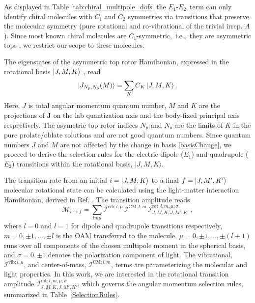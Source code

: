 \documentclass[reprint,aps,prl,twocolumn,superscriptaddress,groupedaddress]{revtex4-2}
\newcommand{\eoet}{$E_1$-$E_2$}
\begin{document}
 




As displayed in Table \ref{tab:chiral_multipole_dofs} the \eoet~term can only identify chiral molecules with $C_1$ and $C_2$ symmetries via transitions that preserve the molecular symmetry (pure rotational and ro-vibrational of the trivial irrep. $A$). Since most known chiral molecules are $C_1$-symmetric,~i.e.,~they are asymmetric tops \cite{Bernath}, we restrict our scope to these molecules.

The eigenstates of the asymmetric top rotor Hamiltonian, expressed in the rotational basis $\ket{J,M,K}$ \cite{Bernath}, read 
\begin{equation}
    \ket{J_{N_p,N_o}(M)}=\sum_KC_K\ket{J,M,K}.
    \label{basisChange}
\end{equation}
Here, $J$ is total angular momentum quantum number, $M$ and $K$ are the projections of ${\bm J}$ on the lab quantization axis and the body-fixed principal axis respectively. The asymetric top rotor indices $N_p$ and $N_o$ are the limits of $K$ in the pure prolate/oblate solutions and are not good quantum numbers. Since quantum numbers $J$ and $M$ are not affected by the change in basis \eqref{basisChange}, we proceed to derive the selection rules for the electric dipole ($E_1$) and quadrupole ($E_2$) transitions within the rotational basis, $| J, M, K \rangle$.

The transition rate from an initial $i=\ket{J,M,K}$ to a final $f=\ket{J,M',K'}$ molecular rotational state can be calculated using the light-matter interaction Hamiltonian, derived in Ref. \cite{Maslov2024,Maslov_Thesis}. The transition amplitude reads
\begin{equation}
    \mathcal{M}_{i\to f}=\sum_{lm\mu}\mathcal{I}^{\text{vib}; l,\mu}\,\mathcal{I}^{\text{CM}; l,m}\,\mathcal{I}^{\text{rot}; l,m,\mu,\sigma}_{J,M,K,J,M',K'}\,,
    \label{eq_transition_matrix}
\end{equation}
where $l=0$ and $l=1$ for dipole and quadrupole transitions respectively, $m = 0, \pm 1, \dots, \pm l$ is the OAM transferred to the molecule, $\mu = 0, \pm 1, \dots, \pm (l+1)$ runs over all components of the chosen multipole moment in the spherical basis, and $\sigma =0, \pm 1$ denotes the polarization component of light. The vibrational, $\mathcal{I}^{\text{vib}; l,\mu}$, and center-of-mass, $\mathcal{I}^{\text{CM}; l,m}$, terms are parameterizing the molecular and light properties. In this work, we are interested in the rotational transition amplitude $\mathcal{I}^{\text{rot};l,m,\mu,\sigma}_{J,M,K,J,M',K'}$, which governs the angular momentum selection rules, summarized in Table~\ref{SelectionRules}.
\end{document}
